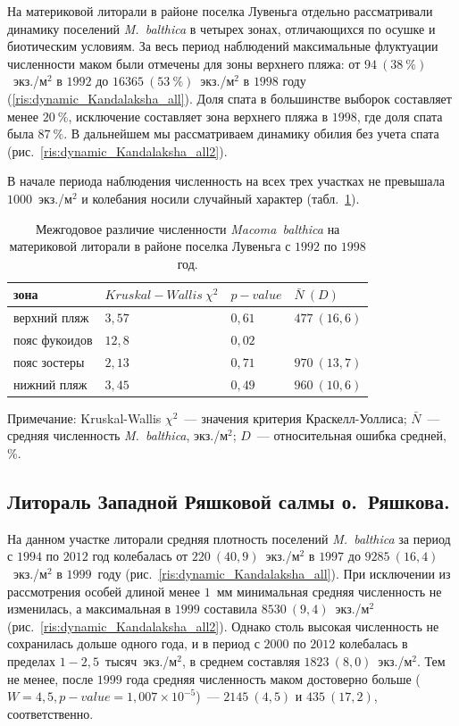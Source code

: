 На материковой литорали в районе поселка Лувеньга отдельно рассматривали динамику поселений {\it M.~balthica} в четырех зонах, отличающихся по осушке и биотическим условиям.
За весь период наблюдений максимальные флуктуации численности маком были отмечены для зоны верхнего пляжа: от $94~(38~\%)$~экз./м$^2$ в $1992$ до $16365~(53~\%)$~экз./м$^2$ в $1998$ году (\ref{ris:dynamic_Kandalaksha_all}). 
Доля спата в большинстве выборок составляет менее $20~\%$, исключение составляет зона верхнего пляжа в $1998$, где доля спата была $87~\%$.
В дальнейшем мы рассматриваем динамику обилия без учета спата (рис.~\ref{ris:dynamic_Kandalaksha_all2}).

В начале периода наблюдения численность на всех трех участках не превышала $1000$~экз./м$^2$ и колебания носили случайный характер (табл.~\ref{tab:2razrez_N2_Kruskal}).

	\begin{table}[p]
	\begin{tabularx}{\textwidth}{|*{4}{X|}} \hline
	зона & $Kruskal-Wallis\ \chi^2$ & $p-value$ & $\bar{N} ~ (D)$ \\ 
	\hline
	верхний пляж & $3,57$ & $0,61$ & $477~(16,6)$ \\
	\hline
	пояс фукоидов & $12,8$ & $0,02$ & $ $\\
	\hline
	пояс зостеры & $2,13$ & $0,71$ & $970~(13,7)$ \\
	\hline
	нижний пляж & $3,45$ & $0,49$ & $960~(10,6)$ \\
	\hline
	\end{tabularx}
	{\footnotesize Примечание: Kruskal-Wallis $\chi^2$~--- значения критерия Краскелл-Уоллиса; $\bar{N}$~--- средняя численность {\it 	M.~balthica}, экз./м$^2$; $D$~--- относительная ошибка средней, \%.}
	\caption{Межгодовое различие численности {\it Macoma~balthica} на материковой литорали в районе поселка Лувеньга с $1992$ по $1998$ год.}
	\label{tab:2razrez_N2_Kruskal}
	\end{table}


		\subsection{Литораль Западной Ряшковой салмы о.~Ряшкова.}

На данном участке литорали средняя плотность поселений {\it M.~balthica} за период с $1994$ по $2012$ год колебалась от $220~(40,9)$~экз./м$^2$ в $1997$ до $9285~(16,4)$~экз./м$^2$ в $1999$~году (рис.~\ref{ris:dynamic_Kandalaksha_all}).
При исключении из рассмотрения особей длиной менее $1$~мм минимальная средняя численность не изменилась, а максимальная в $1999$ составила $8530~(9,4)$~экз./м$^2$ (рис.~\ref{ris:dynamic_Kandalaksha_all2}).
Однако столь высокая численность не сохранилась дольше одного года, и в период с $2000$ по $2012$ колебалась в пределах $1 - 2,5$~тысяч~экз./м$^2$, в среднем составляя $1823~(8,0)$~экз./м$^2$.
Тем не менее, после $1999$ года средняя численность маком достоверно больше ($W = 4,5, p-value = 1,007 \times 10^{-5}$)~--- $2145~(4,5)$ и $435~(17,2)$, соответственно.

